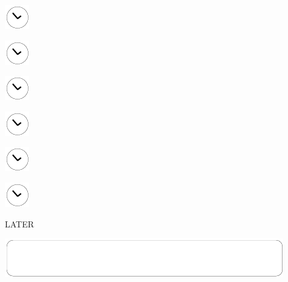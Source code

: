 \documentclass[11pt,titlepage]{article}
\begin{document}
\noindent
\hspace{1mm}\includegraphics[]{clockface.pdf}

\vspace{10,5mm}

\noindent
\hspace{1mm}\includegraphics[]{clockface.pdf}

\vspace{10,5mm}

\noindent
\hspace{1mm}\includegraphics[]{clockface.pdf}

\vspace{10,5mm}

\noindent
\hspace{1mm}\includegraphics[]{clockface.pdf}

\vspace{10,5mm}

\noindent
\hspace{1mm}\includegraphics[]{clockface.pdf}

\vspace{10,5mm}

\noindent
\hspace{1mm}\includegraphics[]{clockface.pdf}

\pagebreak

\small
\hfill LATER

\vspace{6mm}

\noindent
\includegraphics[]{mediumbox.pdf}
\end{document}
